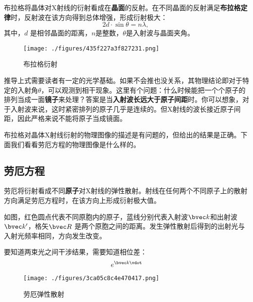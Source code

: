 布拉格将晶体对X射线的衍射看成在\textbf{晶面}的反射。在不同晶面的反射满足\textbf{布拉格定律}时，反射波在该方向得到总体增强，形成衍射极大：
\begin{equation}\label{eq_RecLat_1}
2d \cdot \sin\theta = n\lambda,~
\end{equation}
其中，$d$ 是相邻晶面的距离，$n$是整数，$\theta$是入射波与晶面夹角。
\begin{figure}[ht]
\centering
\texttt{[image: ./figures/435f227a3f827231.png]}
\caption{布拉格衍射} \label{fig_RecLat_2}
\end{figure}
推导上式需要读者有一定的光学基础。如果不会推也没关系，其物理结论即对于特定的入射角$\theta$，可以观测到相干现象。这里有个问题：什么时候能把一个个原子的排列当成一面\textbf{镜子}来处理？答案是当\textbf{入射波长远大于原子间距}时。你可以想象，对于入射波来说，这时紧密排列的原子几乎是连续的。但X射线的波长接近原子间距，因此严格来说不能将原子当成镜面。

布拉格对晶体X射线衍射的物理图像的描述是有问题的，但给出的结果是正确。下面我们看看劳厄方程的物理图像是什么样的。

\subsection{劳厄方程}
劳厄将衍射看成不同\textbf{原子}对X射线的弹性散射。射线在任何两个不同原子上的散射方向满足劳厄方程时，在该方向上形成衍射极大值。

如图，红色圆点代表不同原胞内的原子，蓝线分别代表入射波$\bvec k$和出射波$\bvec k'$，格矢$\bvec R$ 是两个原胞之间的距离。发生弹性散射后得到的出射光与入射光频率相同，方向发生改变。

要知道两束光之间干涉结果，需要知道相位差：
\begin{equation}
e^{\bvec k \vdot }
\end{equation}


\begin{figure}[ht]
\centering
\texttt{[image: ./figures/3ca05c8c4e470417.png]}
\caption{劳厄弹性散射} \label{fig_RecLat_3}
\end{figure}

